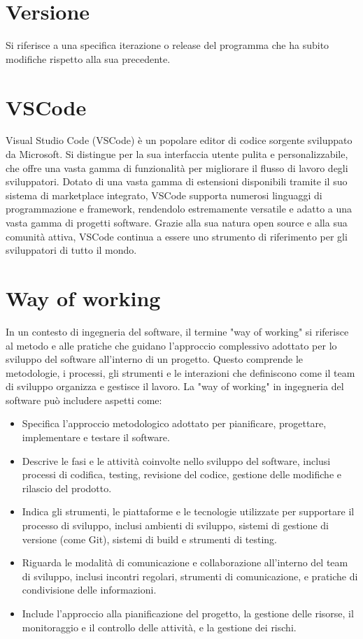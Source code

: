 \documentclass{article}
\begin{document}
\section{Versione}
Si riferisce a una specifica iterazione o release del programma che ha subito modifiche rispetto alla sua precedente.

\section{VSCode}
Visual Studio Code (VSCode) è un popolare editor di codice sorgente sviluppato da Microsoft. Si distingue per la sua interfaccia utente pulita e personalizzabile, che offre una vasta gamma di funzionalità per migliorare il flusso di lavoro degli sviluppatori. Dotato di una vasta gamma di estensioni disponibili tramite il suo sistema di marketplace integrato, VSCode supporta numerosi linguaggi di programmazione e framework, rendendolo estremamente versatile e adatto a una vasta gamma di progetti software. Grazie alla sua natura open source e alla sua comunità attiva, VSCode continua a essere uno strumento di riferimento per gli sviluppatori di tutto il mondo.

\section{Way of working}

In un contesto di ingegneria del software, il termine "way of working" si riferisce al metodo e alle pratiche che guidano l'approccio complessivo adottato per lo sviluppo del software all'interno di un progetto. Questo comprende le metodologie, i processi, gli strumenti e le interazioni che definiscono come il team di sviluppo organizza e gestisce il lavoro. La "way of working" in ingegneria del software può includere aspetti come:
\begin{itemize}
    \item Specifica l'approccio metodologico adottato per pianificare, progettare, implementare e testare il software.
    \item Descrive le fasi e le attività coinvolte nello sviluppo del software, inclusi processi di codifica, testing, revisione del codice, gestione delle modifiche e rilascio del prodotto.
    \item Indica gli strumenti, le piattaforme e le tecnologie utilizzate per supportare il processo di sviluppo, inclusi ambienti di sviluppo, sistemi di gestione di versione (come Git), sistemi di build e strumenti di testing.
    \item Riguarda le modalità di comunicazione e collaborazione all'interno del team di sviluppo, inclusi incontri regolari, strumenti di comunicazione, e pratiche di condivisione delle informazioni.
    \item Include l'approccio alla pianificazione del progetto, la gestione delle risorse, il monitoraggio e il controllo delle attività, e la gestione dei rischi.
\end{itemize}
\end{document}
